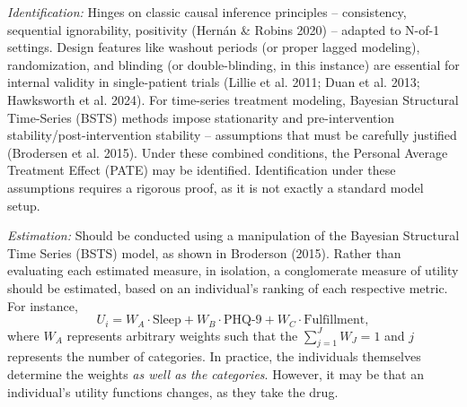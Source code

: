 \documentclass[12pt,letterpaper,doublespace, oneside]{article}
\begin{document}
\noindent

\emph{Identification:} Hinges on classic causal inference principles -- consistency, sequential ignorability, positivity (Hernán \& Robins 2020) -- adapted to N-of-1 settings. Design features like washout periods (or proper lagged modeling), randomization, and blinding (or double-blinding, in this instance) are essential for internal validity in single-patient trials (Lillie et al. 2011; Duan et al. 2013; Hawksworth et al. 2024). For time-series treatment modeling, Bayesian Structural Time-Series (BSTS) methods impose stationarity and pre-intervention stability/post-intervention stability -- assumptions that must be carefully justified (Brodersen et al. 2015). Under these combined conditions, the Personal Average Treatment Effect (PATE) may be identified. Identification under these assumptions requires a rigorous proof, as it is not exactly a standard model setup. 


\noindent

\emph{Estimation:} Should be conducted using a manipulation of the Bayesian Structural Time Series (BSTS) model, as shown in Broderson (2015). Rather than evaluating each estimated measure, in isolation, a conglomerate measure of utility should be estimated, based on an individual’s ranking of each respective metric. For instance, 
\[
U_i = W_A \cdot \text{Sleep} + W_B \cdot \text{PHQ-9} + W_C \cdot \text{Fulfillment},
\]
where $W_A$ represents arbitrary weights such that the $\sum_{j = 1}^JW_J = 1$ and $j$ represents the number of categories. In practice, the individuals themselves determine the weights \emph{as well as the categories}. However, it may be that an individual's utility functions changes, as they take the drug.
\end{document}

